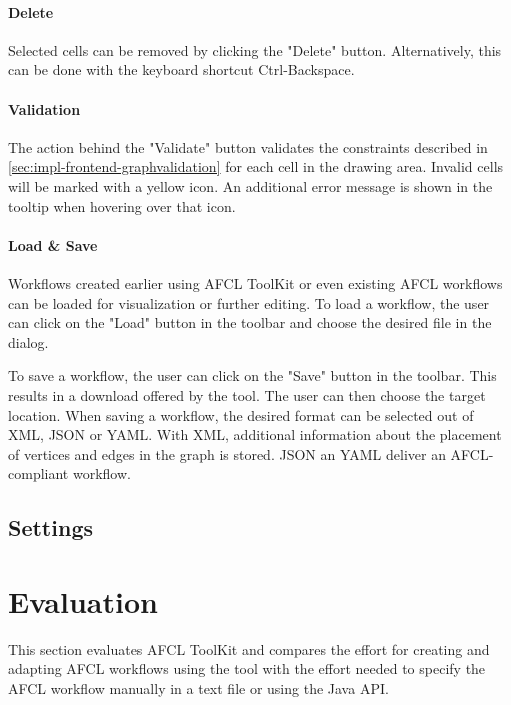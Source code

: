 \documentclass[a4paper,12pt,pdftex,halfparskip,cleardoubleempty,bibtotoc,liststotoc]{scrbook}
\begin{document}
\subsubsection{Delete}

Selected cells can be removed by clicking the "Delete" button. Alternatively, this can be done with the keyboard shortcut \textsf{Ctrl-Backspace}.

\subsubsection{Validation}

The action behind the "Validate" button validates the constraints described in \ref{sec:impl-frontend-graphvalidation} for each cell in the drawing area. Invalid cells will be marked with a yellow icon. An additional error message is shown in the tooltip when hovering over that icon.

\subsubsection{Load \& Save}

Workflows created earlier using AFCL ToolKit or even existing AFCL workflows can be loaded for visualization or further editing. To load a workflow, the user can click on the "Load" button in the toolbar and choose the desired file in the dialog.

To save a workflow, the user can click on the "Save" button in the toolbar.
This results in a download offered by the tool. The user can then choose the target location.  When saving a workflow, the desired format can be selected out of XML, JSON or YAML. With XML, additional information about the placement of vertices and edges in the graph is stored. JSON an YAML deliver an AFCL-compliant workflow.

\section{Settings}



\chapter{Evaluation}

This section evaluates AFCL ToolKit and compares the effort for creating and adapting AFCL workflows using the tool with the effort needed to specify the AFCL workflow manually in a text file or using the Java API.
\end{document}
